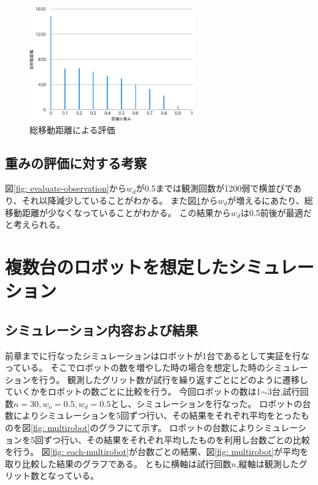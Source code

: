 \documentclass{jsarticle}
\begin{document}
\begin{figure}[tbh]
 \centering
  \includegraphics[height=50mm]{fig/evaluate-distance.eps}
  \vspace*{-4mm}
  \caption{総移動距離による評価}
  \label{fig: evaluate-distance}
\end{figure}

\subsection{重みの評価に対する考察}
図\ref{fig: evaluate-observation}から$w_d$が0.5までは観測回数が1200弱で横並びであり、それ以降減少していることがわかる。
また図\ref{fig: evaluate-distance}から$w_d$が増えるにあたり、総移動距離が少なくなっていることがわかる。
この結果から$w_d$は0.5前後が最適だと考えられる。

\section{複数台のロボットを想定したシミュレーション}
\subsection{シミュレーション内容および結果}

前章までに行なったシミュレーションはロボットが1台であるとして実証を行なっている。
そこでロボットの数を増やした時の場合を想定した時のシミュレーションを行う。
観測したグリット数が試行を繰り返すごとにどのように遷移していくかをロボットの数ごとに比較を行う。
今回ロボットの数は1$\sim$3台,試行回数$n=30,w_o=0.5,w_d=0.5$とし、シミュレーションを行なった。
ロボットの台数によりシミュレーションを5回ずつ行い、その結果をそれぞれ平均をとったものを図\ref{fig: multirobot}のグラフにて示す。
ロボットの台数によりシミュレーションを5回ずつ行い、その結果をそれぞれ平均したものを利用し台数ごとの比較を行う。
図\ref{fig: each-multirobot}が台数ごとの結果、図\ref{fig: multirobot}が平均を取り比較した結果のグラフである。
ともに横軸は試行回数$n$,縦軸は観測したグリット数となっている。
\end{document}
